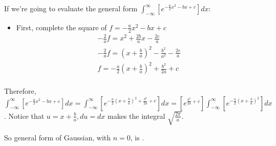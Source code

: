\documentclass[11pt, oneside]{article}   	%
\begin{document}
If we're going to evaluate the general form $\int_{-\infty}^{\infty} [e^{-\frac{a}{2}x^2-bx+c}] dx$:
\begin{itemize}
\item First, complete the square of $f = -\frac{a}{2}x^2-bx+c$
\begin{align}
-\frac{2}{a}f =x^2+\frac{2b}{a}x-\frac{2c}{a} \\
-\frac{2}{a}f =(x+\frac{b}{a})^2-\frac{b^2}{a^2}-\frac{2c}{a} \\
f = -\frac{a}{2}(x+\frac{b}{a})^2 +\frac{b^2}{2a}+c\\
\end{align}
\end{itemize}

Therefore, $\int_{-\infty}^{\infty} [e^{-\frac{a}{2}x^2-bx+c}] dx =  \int_{-\infty}^{\infty} [e^{-\frac{a}{2}(x+\frac{b}{a})^2 +\frac{b^2}{2a}+c}]dx = [e^{\frac{b^2}{2a}+c}] \int_{-\infty}^{\infty} [e^{-\frac{a}{2}(x+\frac{b}{a})^2}] dx$.  Notice that $u = x+\frac{b}{a}, du = dx$ makes the integral $\sqrt{\frac{2\pi}{a}}$.

So general form of Gaussian, with $n=0$, is .
\end{document}
